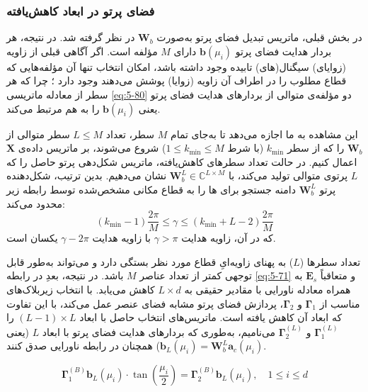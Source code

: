 \subsubsection{فضای پرتو  در ابعاد کاهش‌یافته}
\label{subsubsec:5-6-2}
در بخش قبلی، ماتریس تبدیل فضای پرتو به‌صورت $\bm{W}_b$ در نظر گرفته شد. در نتیجه، هر بردار هدایت فضای پرتو $\bm{b}(\mu_i)$ دارای $M$ مؤلفه است. اگر آگاهی قبلی از زاویه (زوایای) سیگنال(های) تابیده وجود داشته باشد، امکان انتخاب تنها آن مؤلفه‌هایی که قطاع  مطلوب را در اطراف آن زاویه (زوایا) پوشش می‌دهند وجود دارد \cite{5-8}؛ چرا که هر سطر از معادله ماتریسی \eqref{eq:5-80} دو مؤلفه‌ی متوالی از بردارهای هدایت فضای پرتو  یعنی $\bm{b}(\mu_i)$ را به هم مرتبط می‌کند.

این مشاهده به ما اجازه می‌دهد تا به‌جای تمام $M$ سطر، تعداد $L \le M$ سطر متوالی از $\bm{W}_b$ را که از سطر $k_{\min}$ (با شرط $1 \le k_{\min} \le M$) شروع می‌شوند، بر ماتریس داده‌ی $\bm{X}$ اعمال کنیم. در حالت تعداد سطرهای کاهش‌یافته، ماتریس شکل‌دهی پرتو حاصل را که $L$ پرتوی متوالی تولید می‌کند، با $\bm{W}_b^L \in \mathbb{C}^{L \times M}$ نشان می‌دهیم. بدین ترتیب، شکل‌دهنده پرتو $\bm{W}_b^L$ دامنه جستجو برای ها را به قطاع مکانی مشخص‌شده توسط رابطه زیر محدود می‌کند:
\begin{equation}
	(k_{\min} - 1) \frac{2\pi}{M} \leq \gamma \leq (k_{\min} + L - 2) \frac{2\pi}{M}
	\label{eq:5-81}
\end{equation}
که در آن، زاویه هدایت $\gamma > \pi$ با زاویه هدایت $\gamma - 2\pi$ یکسان است.

تعداد سطرها ($L$) به پهنای زاویه‌ایِ قطاع  مورد نظر بستگی دارد و می‌تواند به‌طور قابل توجهی کمتر از تعداد عناصر $M$ باشد. در نتیجه، بعدِ  در رابطه \eqref{eq:5-71} و متعاقباً $\bm{E}_s$ به همراه معادله ناورایی با مقادیر حقیقی به $L \times d$ کاهش می‌یابد. با انتخاب زیربلاک‌های مناسب از $\bm{\Gamma}_1$ و $\bm{\Gamma}_2$، پردازش فضای پرتو مشابه فضای عنصر عمل می‌کند، با این تفاوت که ابعاد آن کاهش یافته است. ماتریس‌های انتخاب حاصل با ابعاد $(L - 1) \times L$ را $\bm{\Gamma}_1^{(L)}$ و $\bm{\Gamma}_2^{(L)}$ می‌نامیم، به‌طوری که بردارهای هدایت فضای پرتو  با ابعاد $L$ (یعنی $\bm{b}_L(\mu_i) = \bm{W}_b^L \bm{a}_c(\mu_i)$) همچنان در رابطه ناورایی صدق کنند.



\begin{equation}
	\bm{\Gamma}_1^{(B)} \bm{b}_L(\mu_i) \cdot \tan\left(\frac{\mu_i}{2}\right) = \bm{\Gamma}_2^{(B)} \bm{b}_L(\mu_i), \quad 1 \le i \le d
	\label{eq:5-82}
\end{equation}

